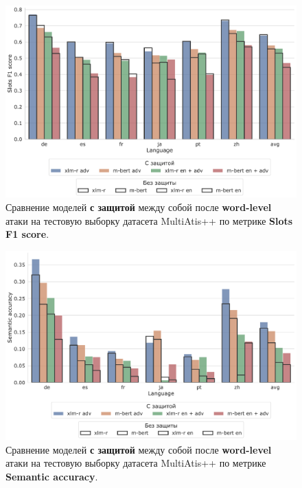 \begin{figure}[h!]
    \centering
    \includegraphics[width=\textwidth]{images/13}
    \caption{Сравнение моделей \textbf{с защитой} между собой после \textbf{word-level} атаки на тестовую выборку датасета MultiAtis++ по метрике \textbf{Slots F1 score}.}\label{fig:figure13}
\end{figure}
\begin{figure}[h!]
    \centering
    \includegraphics[width=\textwidth]{images/14}
    \caption{Сравнение моделей \textbf{с защитой} между собой после \textbf{word-level} атаки на тестовую выборку датасета MultiAtis++ по метрике \textbf{Semantic accuracy}.}\label{fig:figure14}
\end{figure}

